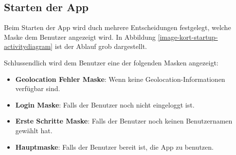 \subsection{Starten der App}
Beim Starten der App wird duch mehrere Entscheidungen festgelegt, welche Maske dem Benutzer angezeigt wird. In Abbildung \ref{image-kort-startup-activitydiagram} ist der Ablauf grob dargestellt.

Schlussendlich wird dem Benutzer eine der folgenden Masken angezeigt:

\begin{itemize}
\item \textbf{Geolocation Fehler Maske}: Wenn keine Geolocation-Informationen verfügbar sind.
\item \textbf{Login Maske}: Falls der Benutzer noch nicht eingeloggt ist.
\item \textbf{Erste Schritte Maske}: Falls der Benutzer noch keinen Benutzernamen gewählt hat.
\item \textbf{Hauptmaske}: Falls der Benutzer bereit ist, die App zu benutzen.
\end{itemize}

